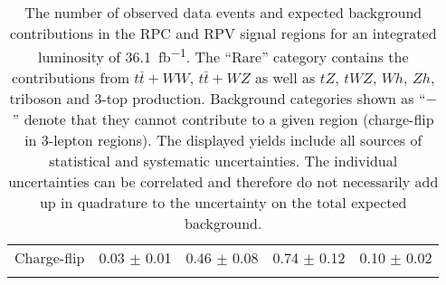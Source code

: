 \begin{table}[htb!]
\begin{center}
{\begin{tabular*}{\textwidth}{@{\extracolsep{\fill}}lcccc}
        Charge-flip    &    0.03 $\pm$ 0.01    &    0.46 $\pm$ 0.08    &    0.74 $\pm$ 0.12    &    0.10 $\pm$ 0.02    \\ 
        
\noalign{\smallskip}\hline\hline\noalign{\smallskip}
\end{tabular*}
}
    
\end{center}
\caption{The number of observed data events and expected background contributions in the RPC and RPV signal regions for an integrated 
luminosity of \SI{36.1}{fb^{-1}}. The ``Rare'' category contains the contributions from $t\bar{t}+WW$, $t\bar{t}+WZ$ as well as $tZ$, $tWZ$, $Wh$, $Zh$, 
triboson and 3-top production. Background categories shown as ``$-$'' denote that they cannot contribute to a given region (charge-flip in 3-lepton regions).
The displayed yields include all sources of statistical and systematic uncertainties. The individual uncertainties can be correlated
and therefore do not necessarily add up in quadrature to the uncertainty on the total expected background.}
\label{tab:observed_sr_yields_table2}
\end{table}
    
